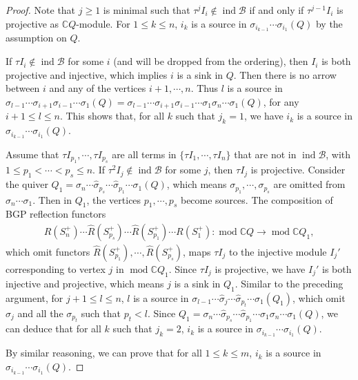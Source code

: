 \documentclass[12pt]{amsart}
\begin{document}
\begin{proof}
    Note that $j\geq 1$ is minimal such that $\tau^j I_i\notin \operatorname{ind}\mathcal{B}$ if and only if $\tau^{j-1}I_i$ is projective as $\mathbb{C}Q$-module.
    For $1\leq k\leq n$, $i_k$ is a source in $\sigma_{i_{k-1}}\cdots\sigma_{i_1}(Q)$ by the assumption on $Q$.

    If $\tau I_i\notin \operatorname{ind}\mathcal{B}$ for some $i$ (and will be dropped from the ordering), then $I_i$ is both projective and injective, which implies $i$ is a sink in $Q$.
    Then there is no arrow between $i$ and any of the vertices $i+1,\cdots,n$.
    Thus $l$ is a source in $\sigma_{l-1}\cdots\sigma_{i+1}\sigma_{i-1}\cdots\sigma_1(Q)=\sigma_{l-1}\cdots\sigma_{i+1}\sigma_{i-1}\cdots\sigma_1\sigma_{n}\cdots\sigma_1(Q)$, for any $i+1\leq l\leq n$.
    This shows that, for all $k$ such that $j_k=1$, we have $i_k$ is a source in $\sigma_{i_{k-1}}\cdots\sigma_{i_1}(Q)$.

    Assume that $\tau I_{p_1},\cdots,\tau I_{p_s}$ are all terms in $\{\tau I_1,\cdots,\tau I_n\}$ that are not in $\operatorname{ind}\mathcal{B}$, with $1\leq p_1<\cdots<p_s\leq n$.
    If $\tau^2 I_j\notin \operatorname{ind}\mathcal{B}$ for some $j$, then $\tau I_j$ is projective.
    Consider the quiver $Q_1=\sigma_n \cdots \hat{\sigma}_{p_s}\cdots \hat{\sigma}_{p_1}\cdots \sigma_1(Q)$, which means $\sigma_{p_1},\cdots,\sigma_{p_s}$ are omitted from $\sigma_n\cdots\sigma_1$.
    Then in $Q_1$, the vertices $p_1,\cdots,p_s$ become sources.
    The composition of BGP reflection functors
    \begin{align*}
        R(S_n^+)\cdots \hat{R}(S_{p_s}^+)\cdots \hat{R}(S_{p_1}^+)\cdots R(S_1^+):\operatorname{mod}\mathbb{C}Q\rightarrow \operatorname{mod}\mathbb{C}Q_1,
    \end{align*}
    which omit functors $\hat{R}(S_{p_1}^+),\cdots,\hat{R}(S_{p_s}^+)$, maps $\tau I_j$ to the injective module $I_j'$ corresponding to vertex $j$ in $\operatorname{mod}\mathbb{C}Q_1$.
    Since $\tau I_j$ is projective, we have $I_j'$ is both injective and projective, which means $j$ is a sink in $Q_1$.
    Similar to the preceding argument, for $j+1\leq l\leq n$, $l$ is a source in $\sigma_{l-1}\cdots \hat{\sigma}_j \cdots \hat{\sigma}_{p_t} \cdots \sigma_1(Q_1)$, which omit $\sigma_j$ and all the $\sigma_{p_t}$ such that $p_t<l$. 
    Since $Q_1=\sigma_n \cdots \hat{\sigma}_{p_s}\cdots \hat{\sigma}_{p_1}\cdots \sigma_1\sigma_n\cdots\sigma_1(Q)$, we can deduce that for all $k$ such that $j_k=2$, $i_k$ is a source in $\sigma_{i_{k-1}}\cdots\sigma_{i_1}(Q)$.

    By similar reasoning, we can prove that for all $1\leq k\leq m$, $i_k$ is a source in $\sigma_{i_{k-1}}\cdots\sigma_{i_1}(Q)$.
\end{proof}
\end{document}
